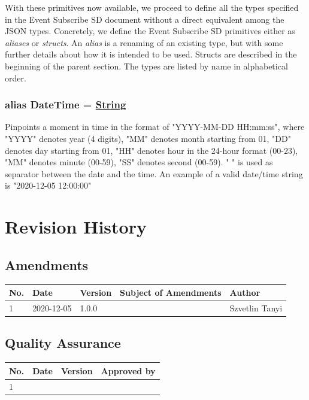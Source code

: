 \documentclass[a4paper]{arrowhead}
\newcommand{\pdef}[1]{{\textcolor{ArrowheadGrey}{#1 \label{sec:model:primitives:#1} \label{sec:model:primitives:#1s}}}}
\newcommand{\pref}[1]{{\textcolor{ArrowheadGrey}{\hyperref[sec:model:primitives:#1]{#1}}}}
\begin{document}
With these primitives now available, we proceed to define all the types specified in the Event Subscribe SD document without a direct equivalent among the JSON types.
Concretely, we define the Event Subscribe SD primitives either as \textit{aliases} or \textit{structs}.
An \textit{alias} is a renaming of an existing type, but with some further details about how it is intended to be used.
Structs are described in the beginning of the parent section.
The types are listed by name in alphabetical order.

\subsubsection{alias \pdef{DateTime} = \pref{String}}

Pinpoints a moment in time in the format of "YYYY-MM-DD HH:mm:ss", where "YYYY" denotes year (4 digits), "MM" denotes month starting from 01, "DD" denotes day starting from 01, "HH" denotes hour in the 24-hour format (00-23), "MM" denotes minute (00-59), "SS" denotes second (00-59). " " is used as separator between the date and the time.
An example of a valid date/time string is "2020-12-05 12:00:00"



\newpage




\newpage

\section{Revision History}
\subsection{Amendments}

\noindent\begin{tabularx}{\textwidth}{| p{1cm} | p{3cm} | p{2cm} | X | p{4cm} |} \hline
\rowcolor{gray!33} No. & Date & Version & Subject of Amendments & Author \\ \hline

1 & 2020-12-05 & 1.0.0 & & Szvetlin Tanyi \\ \hline

\end{tabularx}

\subsection{Quality Assurance}

\noindent\begin{tabularx}{\textwidth}{| p{1cm} | p{3cm} | p{2cm} | X |} \hline
\rowcolor{gray!33} No. & Date & Version & Approved by \\ \hline

1 & & & \\ \hline

\end{tabularx}
\end{document}
